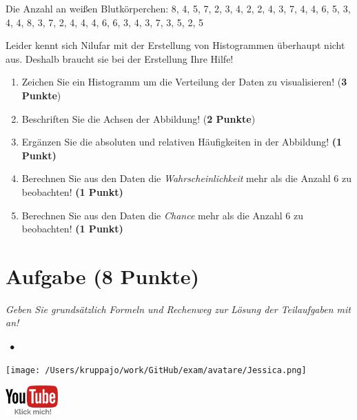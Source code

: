 \documentclass[a4paper, 9pt]{scrartcl}\usepackage[]{graphicx}\usepackage[]{xcolor}
\begin{document}
\begin{center}
Die Anzahl an weißen Blutkörperchen: 8, 4, 5, 7, 2, 3, 4, 2, 2, 4, 3, 7, 4, 4, 6, 5, 3, 4, 4, 8, 3, 7, 2, 4, 4, 4, 6, 6, 3, 4, 3, 7, 3, 5, 2, 5
\end{center}

Leider kennt sich Nilufar mit der Erstellung von Histogrammen überhaupt nicht aus. Deshalb braucht sie bei der Erstellung Ihre Hilfe!

\begin{enumerate}
\item Zeichen Sie ein Histogramm um die Verteilung der Daten zu visualisieren! (\textbf{3 Punkte})
\item Beschriften Sie die Achsen der Abbildung! (\textbf{2 Punkte})
\item Ergänzen Sie die absoluten und relativen Häufigkeiten in der
  Abbildung! \textbf{(1 Punkt)}
\item Berechnen Sie aus den Daten die \textit{Wahrscheinlichkeit}
  mehr als die Anzahl 6 zu beobachten! \textbf{(1
    Punkt)}
\item Berechnen Sie aus den Daten die \textit{Chance} mehr
  als die Anzahl 6 zu beobachten! \textbf{(1 Punkt)}
\end{enumerate}

 
\clearpage

\section{Aufgabe \hfill (8 Punkte)}

\textit{Geben Sie grundsätzlich Formeln und Rechenweg zur Lösung der Teilaufgaben mit an!} \\[1Ex]
 

 
\ifcollection
\begin{flushright}
\tiny\vspace{-3Ex}
\textbf{\examinhaltstart}
\exammodulestatversuch $\;\bullet$
\exammodulebiostat
\vspace{-4Ex}
\end{flushright}
\begin{minipage}[t]{0.5\textwidth}
\texttt{[image: /Users/kruppajo/work/GitHub/exam/avatare/Jessica.png]}
\end{minipage}
\begin{minipage}[t]{0.5\textwidth}
\hfill
\href{https://youtu.be/ORHSPTCdfeY}{\includegraphics[width = 2cm]{img/youtube}}
\end{minipage}
\vspace{-3ex}
\fi
\end{document}
